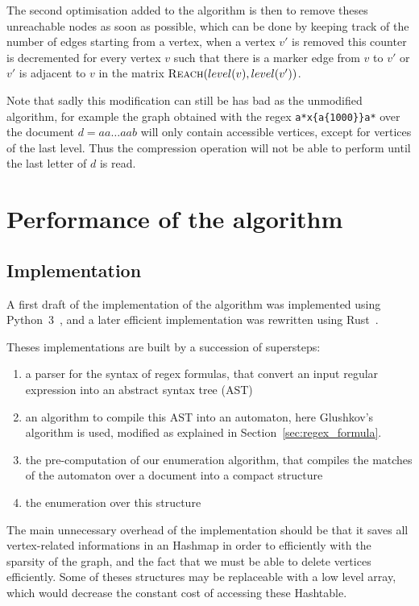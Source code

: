 \documentclass[12px]{article}
\theoremstyle{definition}
\begin{document}
        The second optimisation added to the algorithm is then to remove theses
        unreachable nodes as soon as possible, which can be done by keeping
        track of the number of edges starting from a vertex, when a vertex $v'$
        is removed this counter is decremented for every vertex $v$ such that
        there is a marker edge from $v$ to $v'$ or $v'$ is adjacent to $v$ in
        the matrix $\Call{Reach}{level(v), level(v')}$.

        Note that sadly this modification can still be has bad as the
        unmodified algorithm, for example the graph obtained with the regex
        \texttt{a*x\{a\{1000\}\}a*} over the document $d = aa \ldots aab$ will
        only contain accessible vertices, except for vertices of the last
        level.  Thus the compression operation will not be able to perform
        until the last letter of $d$ is read.

  \section{Performance of the algorithm}

    \subsection{Implementation}

      A first draft of the implementation of the algorithm was implemented
      using Python~3~\cite{implPython}, and a later efficient implementation
      was rewritten using Rust~\cite{implRust}.

      Theses implementations are built by a succession of supersteps:
      \begin{enumerate}
        \item a parser for the syntax of regex formulas, that convert an input
          regular expression into an abstract syntax tree (AST)
        \item an algorithm to compile this AST into an automaton, here
          Glushkov's algorithm is used, modified as explained in
          Section~\ref{sec:regex_formula}.
        \item the pre-computation of our enumeration algorithm, that compiles
          the matches of the automaton over a document into a compact structure
        \item the enumeration over this structure
      \end{enumerate}

      The main unnecessary overhead of the implementation should be that it
      saves all vertex-related informations in an Hashmap in order to
      efficiently with the sparsity of the graph, and the fact that we must be
      able to delete vertices efficiently. Some of theses structures may be
      replaceable with a low level array, which would decrease the constant
      cost of accessing these Hashtable.
\end{document}
